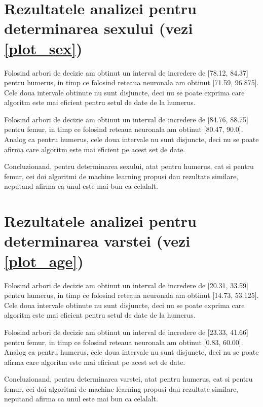 \documentclass[runningheads,a4paper,11pt]{report}
\begin{document}
\section{Rezultatele analizei pentru determinarea sexului (vezi \ref{plot_sex})}
\label{analizaRezultate}

\noindent Folosind arbori de decizie am obtinut un interval de incredere de [78.12, 84.37] pentru humerus, in timp ce folosind reteaua neuronala am obtinut [71.59, 96.875]. Cele doua intervale obtinute nu sunt disjuncte, deci nu se poate exprima care algoritm este mai eficient pentru setul de date de la humerus. 
\newline

\noindent Folosind arbori de decizie am obtinut un interval de incredere de [84.76, 88.75] pentru femur, in timp ce folosind reteaua neuronala am obtinut [80.47, 90.0]. Analog ca pentru humerus, cele doua intervale nu sunt disjuncte, deci nu se poate afirma care algoritm este mai eficient pe acest set de date.
\newline

\noindent Concluzionand, pentru determinarea sexului, atat pentru humerus, cat si pentru femur, cei doi algoritmi de machine learning propusi dau rezultate similare, neputand afirma ca unul este mai bun ca celalalt.

\section{Rezultatele analizei pentru determinarea varstei (vezi \ref{plot_age})}
\label{analizaRezultate}

\noindent Folosind arbori de decizie am obtinut un interval de incredere de [20.31, 33.59] pentru humerus, in timp ce folosind reteaua neuronala am obtinut [14.73, 53.125]. Cele doua intervale obtinute nu sunt disjuncte, deci nu se poate exprima care algoritm este mai eficient pentru setul de date de la humerus. 
\newline \newline \newline

\noindent Folosind arbori de decizie am obtinut un interval de incredere de [23.33, 41.66] pentru femur, in timp ce folosind reteaua neuronala am obtinut [0.83, 60.00]. Analog ca pentru humerus, cele doua intervale nu sunt disjuncte, deci nu se poate afirma care algoritm este mai eficient pe acest set de date.
\newline

\noindent Concluzionand, pentru determinarea varstei, atat pentru humerus, cat si pentru femur, cei doi algoritmi de machine learning propusi dau rezultate similare, neputand afirma ca unul este mai bun ca celalalt. \newline
\end{document}
